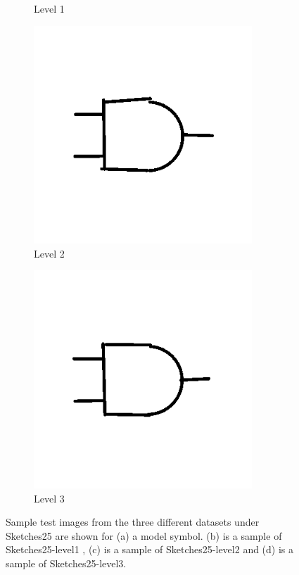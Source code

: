 \begin{figure}[h]
\begin{subfigure}[b]{0.25\textwidth}
                \caption{Level 1}
        \end{subfigure}
                \begin{subfigure}[b]{0.25\textwidth}
                \centering
                \includegraphics[width=0.9\textwidth]{figures/Results/Sketches25/level2.png}
                \caption{Level 2}
        \end{subfigure}
                \begin{subfigure}[b]{0.25\textwidth}
                \centering
                \includegraphics[width=0.9\textwidth]{figures/Results/Sketches25/level3.png}
                \caption{Level 3}
        \end{subfigure}
        \caption[Sample data from 'Sketches25' dataset]{Sample test images from the three different datasets under Sketches25 are shown for (a) a model symbol. (b) is a sample of Sketches25-level1 , (c)  is a sample of Sketches25-level2 and (d) is a sample of Sketches25-level3.}
        \label{fig:Sketches25Examples}
\end{figure}


